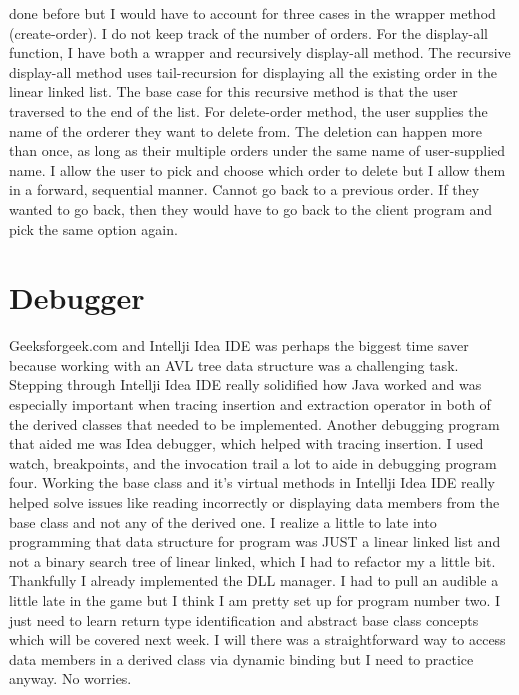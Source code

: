 \documentclass[11pt, a4paper]{article}
\begin{document}
done before but I would have to account for three cases in the wrapper method (create-order). I do not keep track of the number of orders. For the display-all function, I have both a wrapper and recursively display-all method. The recursive display-all method uses tail-recursion for displaying all the existing order in the linear linked list. The base case for this recursive method is that the user traversed to the end of the list. For delete-order method, the user supplies the name of the orderer they want to delete from. The deletion can happen more than once, as long as their multiple orders under the same name of user-supplied name. I allow the user to pick and choose which order to delete but I allow them in a forward, sequential manner. Cannot go back to a previous order. If they wanted to go back, then they would have to go back to the client program and pick the same option again.

\section*{Debugger}
Geeksforgeek.com and Intellji Idea IDE was perhaps the biggest time saver because working with an AVL tree data structure was a challenging task. Stepping through Intellji Idea IDE really solidified how Java worked and was especially important when tracing insertion and extraction operator in both of the derived classes that needed to be implemented. Another debugging program that aided me was Idea debugger, which helped with tracing insertion. I used watch, breakpoints, and the invocation trail a lot to aide in debugging program four. Working the base class and it's virtual methods in Intellji Idea IDE really helped solve issues like reading incorrectly or displaying data members from the base class and not any of the derived one. I realize a little to late into programming that data structure for program was JUST a linear linked list and not a binary search tree of linear linked, which I had to refactor my a little bit. Thankfully I already implemented the DLL manager. I had to pull an audible a little late in the game but I think I am pretty set up for program number two. I just need to learn return type identification and abstract base class concepts which will be covered next week. I will there was a straightforward way to access data members in a derived class via dynamic binding but I need to practice anyway. No worries.
\end{document}
